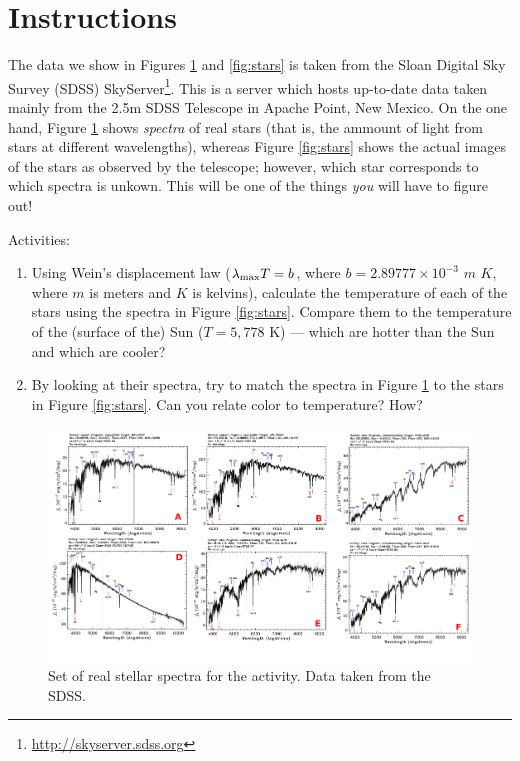 \documentclass{tufte-handout}
\begin{document}
\section{Instructions}\label{sec:intro}
\begin{fullwidth}
The data we show in Figures \ref{fig:spectra} and \ref{fig:stars} is taken from the Sloan Digital Sky Survey (SDSS) 
SkyServer\footnote{\url{http://skyserver.sdss.org}}. This is a server which hosts up-to-date data taken mainly from the 
2.5m SDSS Telescope in Apache Point, New Mexico. On the one hand, Figure \ref{fig:spectra} shows \textit{spectra} of real 
stars (that is, the ammount of light from stars at different wavelengths), whereas Figure \ref{fig:stars} shows the actual 
images of the stars as observed by the telescope; however, which star corresponds to which spectra is unkown. This will be 
one of the things \textit{you} will have to figure out!

Activities:

\begin{enumerate}
\item Using Wein's displacement law ($\lambda_{\textnormal{max}}T = b$, where $b=2.89777\times 10^{-3}$ $m$ $K$, where $m$ is 
meters and $K$ is kelvins), calculate the temperature of each of the stars using the spectra in Figure \ref{fig:stars}. Compare 
them to the temperature of the (surface of the) Sun ($T = 5,778$ K) --- which are hotter than the Sun and which are cooler?
\item By looking at their spectra, try to match the spectra in Figure \ref{fig:spectra} to the stars in Figure \ref{fig:stars}. Can you relate color to temperature? How?
\end{enumerate}

\begin{figure}
  \includegraphics[width=1.5\columnwidth]{figures_activity1/spectra1.pdf}
  \caption{Set of real stellar spectra for the activity. Data taken from the SDSS.}
  \label{fig:spectra}
\end{figure}


\end{fullwidth}
\end{document}
